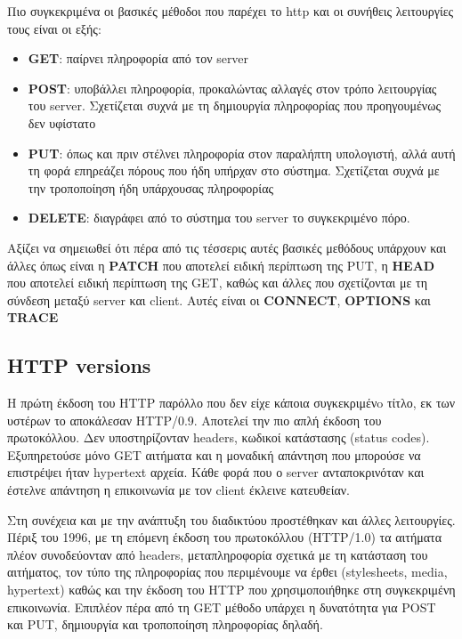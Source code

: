 Πιο συγκεκριμένα οι βασικές μέθοδοι που παρέχει το http και οι συνήθεις λειτουργίες τους είναι οι εξής:

\begin{itemize}
	\item \textbf{GET}: παίρνει πληροφορία από τον server
	\item \textbf{POST}: υποβάλλει πληροφορία, προκαλώντας αλλαγές στον τρόπο λειτουργίας του server. Σχετίζεται συχνά με τη δημιουργία πληροφορίας που προηγουμένως δεν υφίστατο 
	\item \textbf{PUT}: όπως και πριν στέλνει πληροφορία στον παραλήπτη υπολογιστή, αλλά αυτή τη φορά επηρεάζει πόρους που ήδη υπήρχαν στο σύστημα. Σχετίζεται συχνά με την τροποποίηση ήδη υπάρχουσας πληροφορίας
	\item \textbf{DELETE}: διαγράφει από το σύστημα του server το συγκεκριμένο πόρο.
\end{itemize}

Αξίζει να σημειωθεί ότι πέρα από τις τέσσερις αυτές βασικές μεθόδους υπάρχουν και άλλες όπως είναι 
η \textbf{PATCH} που αποτελεί ειδική περίπτωση της PUT, η \textbf{HEAD} που αποτελεί ειδική περίπτωση της GET,
καθώς και άλλες που σχετίζονται με τη σύνδεση μεταξύ server και client. Αυτές είναι οι \textbf{CONNECT}, \textbf{OPTIONS} και \textbf{TRACE} 

\subsection{HTTP versions}
\label{subsec:http_versions}

Η πρώτη έκδοση του HTTP παρόλλο που δεν είχε κάποια συγκεκριμένo τίτλο, εκ των υστέρων το αποκάλεσαν 
HTTP/0.9. Αποτελεί την πιο απλή έκδοση του πρωτοκόλλου. Δεν υποστηρίζονταν headers, κωδικοί κατάστασης (status codes).
Εξυπηρετούσε μόνο GET αιτήματα και η μοναδική απάντηση που μπορούσε να επιστρέψει ήταν hypertext αρχεία. Kάθε φορά που ο server ανταποκρινόταν και έστελνε
απάντηση η επικοινωνία με τον client έκλεινε κατευθείαν.

Στη συνέχεια και με την ανάπτυξη του διαδικτύου προστέθηκαν και άλλες λειτουργίες. Πέριξ του 1996,
με τη επόμενη έκδοση του πρωτοκόλλου (HTTP/1.0) τα αιτήματα πλέον συνοδεύονταν από headers, μεταπληροφορία σχετικά
με τη κατάσταση του αιτήματος, τον τύπο της πληροφορίας που περιμένουμε να έρθει (stylesheets, media, hypertext) καθώς και 
την έκδοση του HTTP που χρησιμοποιήθηκε στη συγκεκριμένη επικοινωνία. Επιπλέον πέρα από τη GET μέθοδο υπάρχει η
δυνατότητα για POST και PUT, δημιουργία και τροποποίηση πληροφορίας δηλαδή.

